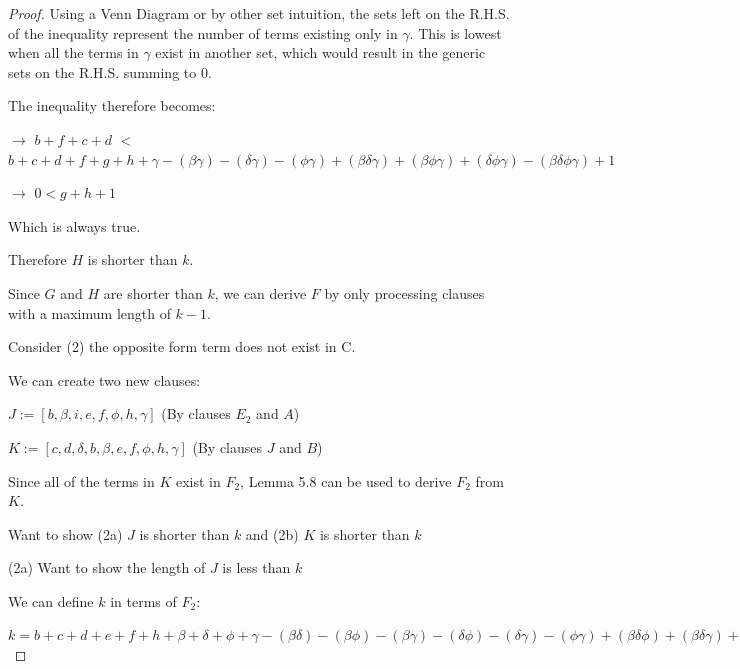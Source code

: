 \documentclass[manuscript]{acmart}
\begin{document}
\begin{proof}

        Using a Venn Diagram or by other set intuition, the sets left on the R.H.S.
        of the inequality represent the number of terms existing only in $\gamma$.
        This is lowest when all the terms in $\gamma$ exist in another set, which
        would result in the generic sets on the R.H.S. summing to 0.

        The inequality therefore becomes:

        $\rightarrow$
        $b + f + c + d$
        $<$
        $b + c + d + f + g + h 
        + \gamma
        - (\beta \gamma) - (\delta \gamma) - (\phi \gamma)
        + (\beta \delta \gamma) + (\beta \phi \gamma) + (\delta \phi \gamma)
        - (\beta \delta \phi \gamma)
        + 1
        $

        $\rightarrow$
        $0 < g + h + 1$

        Which is always true.

        Therefore $H$ is shorter than $k$.

        Since $G$ and $H$ are shorter than $k$, we can derive $F$
        by only processing clauses with a maximum length of $k-1$.

        Consider (2) the opposite form term does not exist in C.

        We can create two new clauses:

        $J := [b, \beta, i, e, f, \phi, h, \gamma]$ (By clauses $E_2$ and $A$)

        $K := [c, d, \delta, b, \beta, e, f, \phi, h, \gamma]$ (By clauses $J$ and $B$)

        Since all of the terms in $K$ exist in $F_2$, Lemma 5.8 can be used
        to derive $F_2$ from $K$.

        Want to show (2a) $J$ is shorter than $k$ and (2b) $K$ is shorter than $k$

        (2a) Want to show the length of $J$ is less than $k$
        
        We can define $k$ in terms of $F_2$:

        $k = b + c + d + e + f + h
        + \beta + \delta + \phi + \gamma
        - (\beta \delta) - (\beta \phi) - (\beta \gamma) - (\delta \phi) - (\delta \gamma) - (\phi \gamma)
        + (\beta \delta \phi) + (\beta \delta \gamma) + (\beta \phi \gamma) + (\delta \phi \gamma)
        - (\beta \delta \phi \gamma)
        + 1
        $


\end{proof}
\end{document}
